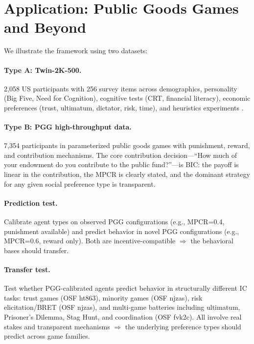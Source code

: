 \documentclass[12pt]{article}
\begin{document}
\section{Application: Public Goods Games and Beyond}
\label{sec:application}

We illustrate the framework using two datasets:

\paragraph{Type A: Twin-2K-500.}
2,058 US participants with 256 survey items across demographics, personality (Big Five, Need for Cognition), cognitive tests (CRT, financial literacy), economic preferences (trust, ultimatum, dictator, risk, time), and heuristics experiments \citep{toubia2025twin}.

\paragraph{Type B: PGG high-throughput data.}
7,354 participants in parameterized public goods games with punishment, reward, and contribution mechanisms. The core contribution decision---``How much of your endowment do you contribute to the public fund?''---is BIC: the payoff is linear in the contribution, the MPCR is clearly stated, and the dominant strategy for any given social preference type is transparent.

\paragraph{Prediction test.}
Calibrate agent types on observed PGG configurations (e.g., MPCR=0.4, punishment available) and predict behavior in novel PGG configurations (e.g., MPCR=0.6, reward only). Both are incentive-compatible $\Rightarrow$ the behavioral bases should transfer.

\paragraph{Transfer test.}
Test whether PGG-calibrated agents predict behavior in structurally different IC tasks: trust games (OSF ht863), minority games (OSF njzas), risk elicitation/BRET (OSF njzas), and multi-game batteries including ultimatum, Prisoner's Dilemma, Stag Hunt, and coordination (OSF fvk2c). All involve real stakes and transparent mechanisms $\Rightarrow$ the underlying preference types should predict across game families.
\end{document}
